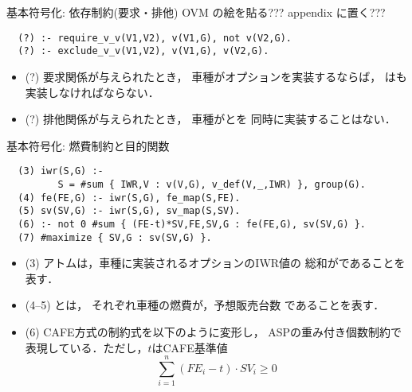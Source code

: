 \documentclass[dvipdfmx, 11pt]{beamer}
\begin{document}
\begin{frame}[fragile]{基本符号化: 依存制約(要求・排他)}
\alert{OVM の絵を貼る???}
\alert{appendix に置く???}
\vfill
\begin{exampleblock}{}
\begin{lstlisting}
  (?) :- require_v_v(V1,V2), v(V1,G), not v(V2,G).
  (?) :- exclude_v_v(V1,V2), v(V1,G), v(V2,G).
\end{lstlisting}
\end{exampleblock}
\vfill
\begin{itemize}
\item (?)
  要求関係が与えられたとき，
  車種がオプションを実装するならば，
  はも実装しなければならない．
\item (?)
  排他関係が与えられたとき，
  車種がとを
  同時に実装することはない．
\end{itemize}
\end{frame}
\begin{frame}[fragile]{基本符号化: 燃費制約と目的関数}
\begin{exampleblock}{}\small
\begin{lstlisting}
  (3) iwr(S,G) :- 
         S = #sum { IWR,V : v(V,G), v_def(V,_,IWR) }, group(G).
  (4) fe(FE,G) :- iwr(S,G), fe_map(S,FE).
  (5) sv(SV,G) :- iwr(S,G), sv_map(S,SV).
  (6) :- not 0 #sum { (FE-t)*SV,FE,SV,G : fe(FE,G), sv(SV,G) }.
  (7) #maximize { SV,G : sv(SV,G) }.
\end{lstlisting}
\end{exampleblock}
\vfill
\begin{itemize}
\item (3)
  アトムは，車種に実装されるオプションのIWR値の
  総和がであることを表す．
\item (4--5)
  とは，
  それぞれ車種の燃費が，予想販売台数
  であることを表す．
\item (6)
  CAFE方式の制約式を以下のように変形し，
  ASPの重み付き個数制約で表現している．ただし，$t$はCAFE基準値
  \[\sum_{i=1}^{n} (FE_{i}-t)\cdot SV_{i} \geq 0\]
\end{itemize}
\end{frame}
\end{document}
